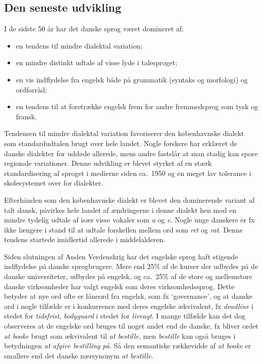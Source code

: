 \documentclass[]{../../metanetpaper}
\begin{document}
\begin{multicols}{2}

\subsection{Den seneste udvikling}

 I de sidste 50 \aa r har det danske sprog v\ae ret domineret af:
\begin{itemize}
\item 	en tendens til mindre dialektal variation;
\item	en mindre distinkt udtale af visse lyde i talesproget;
\item	en vis indflydelse fra engelsk b\aa de \mbox{p\aa} grammatik (syntaks og morfologi) og ordforr\aa d;
\item	en tendens til at foretr\ae kke engelsk frem for andre fremmedsprog som tysk og fransk.
\end{itemize}
Tendensen til mindre dialektal variation favoriserer den k\o benhavnske dialekt som standardudtalen brugt over hele landet. Nogle forskere har erkl\ae ret de danske dialekter for udd\o de allerede, mens andre fastsl\aa r at man stadig kan spore regionale variationer. Denne udvikling er blevet styrket af en st\ae rk standardisering af sproget i medierne siden ca.\ 1950 og en meget lav tolerance i skolesystemet over for dialekter. 

Efterh\aa nden som den k\o benhavnske dialekt er blevet den dominerende variant af talt dansk, p\aa virkes hele landet af \ae ndringerne i denne dialekt hen mod en mindre tydelig udtale af is\ae r visse vokaler som {\it a} og {\it e}. Nogle unge danskere er fx ikke l\ae ngere i stand til at udtale forskellen mellem ord som {\it ret} og {\it rat}. Denne tendens startede imidlertid allerede i middelalderen.

Siden slutningen af Anden Verdenskrig har det engelske sprog haft stigende indflydelse \mbox{p\aa} danske sprogbrugere. Mere end 25\% af de kurser der udbydes \mbox{p\aa} de danske universiteter, udbydes \mbox{p\aa} engelsk, og ca.\ 25\% af de store og mellemstore danske virksomheder har valgt engelsk som deres virksomhedssprog. Dette betyder at nye ord ofte er l\aa neord fra engelsk, som fx `governance', og at danske ord i nogle tilf\ae lde er i konkurrence med deres engelske \ae kvivalent, fx {\it deadline} i stedet for {\it tidsfrist}, {\it bodyguard} i stedet for {\it livvagt}. I mange tilf\ae lde kan det dog observeres at de engelske ord bruges til noget andet end de danske, fx bliver ordet {\it at booke} brugt som \ae kvivalent til {\it at bestille}, men {\it bestille} kan \mbox{ogs\aa} bruges i betydningen {\it at afgive bestilling \mbox{p\aa}}. \mbox{S\aa} den semantiske r\ae kkevidde af {\it at booke} er smallere end det danske n\ae rsynonym {\it at bestille}.


\end{multicols}
\end{document}
